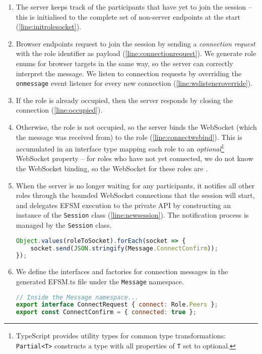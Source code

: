 \begin{enumerate}
\item
The server keeps track of the participants that 
have yet to join the session -- this is initialised to the
complete set of
non-server endpoints at the start (\cref{line:initrolesocket}).

\item
Browser endpoints request to join the session
by sending a \textit{connection request} with the role
identifier as payload (\cref{line:connectionrequest}). 
We generate role enums for browser targets
in the same way, so the server can correctly
interpret the message.
We listen to connection requests by overriding the
\texttt{onmessage} event listener for every new connection
(\cref{line:wslisteneroverride}).

\item
If the role is already occupied, then the server
responds by closing the connection (\cref{line:occupied}).

\item
Otherwise, the role is not occupied, so the server binds
the WebSocket (which the message was received from) to the role
(\cref{line:connectwsbind}).
This is accumulated in an interface type mapping each
role to an \textit{optional}\footnote{
TypeScript provides utility types for common type transformations:
\texttt{Partial<T>} constructs a type with all properties
of \texttt{T} set to optional.
} 
WebSocket property
-- for roles who have
not yet connected, we do not know the WebSocket binding, so the
WebSocket for these roles are .

\item
When the server is no longer waiting for any participants,
it notifies all other roles through the bounded WebSocket
connections that the session will start, and delegates
EFSM execution to the private API by constructing
an instance of the \texttt{Session} class (\cref{line:newsession}).
The notification process is managed by the \texttt{Session} class.

\begin{lstlisting}[language=javascript,tabsize=2,numbers=none]
Object.values(roleToSocket).forEach(socket => {
	socket.send(JSON.stringify(Message.ConnectConfirm));
});
\end{lstlisting}

\item
We define the interfaces and factories for connection messages 
in the generated EFSM.ts file under
the \texttt{Message} namespace.

\begin{lstlisting}[language=javascript,tabsize=2,numbers=none]
// Inside the Message namespace...
export interface ConnectRequest { connect: Role.Peers };
export const ConnectConfirm = { connected: true };
\end{lstlisting}
\end{enumerate}

